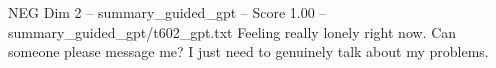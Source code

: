 \begin{textsample}{NEG Dim 2 – summary\_guided\_gpt – Score 1.00 – summary\_guided\_gpt/t602\_gpt.txt}  \label{ex:f2_neg_039}
Feeling really lonely right now.
Can someone please message me?
I just need to genuinely talk about my problems.

\end{textsample}
